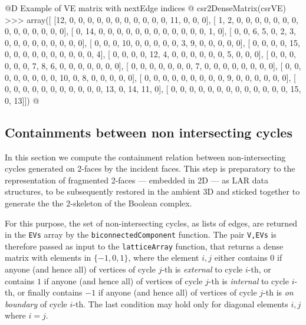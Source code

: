 \documentclass[11pt,oneside]{article}    %
\begin{document}
@D Example of VE matrix with nextEdge indices @{
csr2DenseMatrix(csrVE)
>>> array([
    [12,  0,  0,  0,  0,  0,  0,  0,  0,  0,  0,  0, 11,  0,  0,  0], 
    [ 1,  2,  0,  0,  0,  0,  0,  0,  0,  0,  0,  0,  0,  0,  0,  0], 
    [ 0, 14,  0,  0,  0,  0,  0,  0,  0,  0,  0,  0,  0,  0,  1,  0], 
    [ 0,  0,  6,  5,  0,  2,  3,  0,  0,  0,  0,  0,  0,  0,  0,  0], 
    [ 0,  0,  0, 10,  0,  0,  0,  0,  0,  3,  9,  0,  0,  0,  0,  0], 
    [ 0,  0,  0,  0, 15,  0,  0,  0,  0,  0,  0,  0,  0,  0,  0,  4], 
    [ 0,  0,  0,  0, 12,  4,  0,  0,  0,  0,  0,  0,  5,  0,  0,  0], 
    [ 0,  0,  0,  0,  0,  0,  7,  8,  6,  0,  0,  0,  0,  0,  0,  0], 
    [ 0,  0,  0,  0,  0,  0,  0,  7,  0,  0,  0,  0,  0,  0,  0,  0], 
    [ 0,  0,  0,  0,  0,  0,  0,  0, 10,  0,  8,  0,  0,  0,  0,  0], 
    [ 0,  0,  0,  0,  0,  0,  0,  0,  0,  9,  0,  0,  0,  0,  0,  0], 
    [ 0,  0,  0,  0,  0,  0,  0,  0,  0,  0,  0, 13,  0, 14, 11,  0], 
    [ 0,  0,  0,  0,  0,  0,  0,  0,  0,  0,  0,  0,  0, 15,  0, 13]])
@}

\subsection{Containments between non intersecting cycles}

In this section we compute the containment relation between non-intersecting cycles generated on 2-faces by the incident faces. This step is preparatory to the representation of fragmented 2-faces --- embedded in 2D --- as LAR data structures, to be subsequently restored in the ambient 3D and sticked together to generate the the 2-skeleton of the Boolean complex.

For this purpose, the set of non-intersecting cycles, as lists of edges, are returned in the \texttt{EVs} array by the \texttt{biconnectedComponent} function. The pair \texttt{V,EVs} is therefore passed as input to the \texttt{latticeArray} function, that returns a dense matrix with elements in $\{-1,0,1\}$, where the element $i,j$ either contains $0$ if anyone (and hence all) of vertices of cycle $j$-th is \emph{external} to cycle $i$-th, or contains $1$ if anyone (and hence all) of vertices of cycle $j$-th is \emph{internal} to cycle $i$-th, or finally contains $-1$ if anyone (and hence all) of vertices of cycle $j$-th is \emph{on boundary} of cycle $i$-th. The last condition may hold only for diagonal elements $i,j$ where $i=j$.
\end{document}
